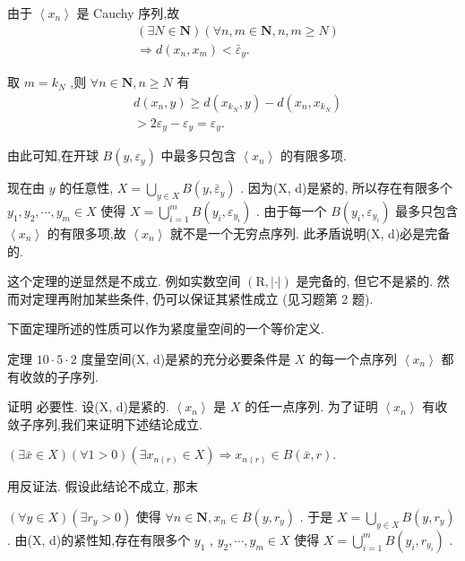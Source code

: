 由于 $\left\langle  {x}_{n}\right\rangle$ 是 Cauchy 序列,故
\begin{align*}
	&\left( {\exists N \in  \mathbf{N}}\right) \left( {\forall n,m \in  \mathbf{N},n,m \geq  N}\right)\\
	&\Rightarrow  d\left( {{x}_{n},{x}_{m}}\right)  < {\bar{\varepsilon }}_{y}.
\end{align*}

取 $m = {k}_{N}$ ,则 $\forall n \in  \mathbf{N},n \geq  N$ 有
\begin{align*}
	&d\left( {{x}_{n},y}\right)  \geq  d\left( {{x}_{{k}_{N}},y}\right)  - d\left( {{x}_{n},{x}_{{k}_{N}}}\right)\\
	&> 2{\varepsilon }_{y} - {\varepsilon }_{y} = {\varepsilon }_{y}.
\end{align*}

由此可知,在开球 $B\left( {y,{\varepsilon }_{y}}\right)$ 中最多只包含 $\left\langle  {x}_{n}\right\rangle$ 的有限多项.

现在由 $y$ 的任意性, $X = \mathop{\bigcup }\limits_{{y \in  X}}B\left( {y,{\bar{\varepsilon }}_{y}}\right)$ . 因为(X, d)是紧的, 所以存在有限多个 ${y}_{1},{y}_{2},\cdots ,{y}_{m} \in  X$ 使得 $X = \mathop{\bigcup }\limits_{{i = 1}}^{m}B\left( {{y}_{i},{\varepsilon }_{{y}_{i}}}\right)$ . 由于每一个 $B\left( {{y}_{i},{\varepsilon }_{{y}_{i}}}\right)$ 最多只包含 $\left\langle  {x}_{n}\right\rangle$ 的有限多项,故 $\left\langle  {x}_{n}\right\rangle$ 就不是一个无穷点序列. 此矛盾说明(X, d)必是完备的.

这个定理的逆显然是不成立. 例如实数空间 $\left( {\mathrm{R},\left| \cdot \right| }\right)$ 是完备的, 但它不是紧的. 然而对定理再附加某些条件, 仍可以保证其紧性成立 (见习题第 2 题).

下面定理所述的性质可以作为紧度量空间的一个等价定义.

定理 ${10} \cdot  5 \cdot  2$ 度量空间(X, d)是紧的充分必要条件是 $X$ 的每一个点序列 $\left\langle  {x}_{n}\right\rangle$ 都有收敛的子序列.

证明 必要性. 设(X, d)是紧的. $\left\langle  {x}_{n}\right\rangle$ 是 $X$ 的任一点序列. 为了证明 $\left\langle  {x}_{n}\right\rangle$ 有收敛子序列,我们来证明下述结论成立.

$\left( {\exists \bar{x} \in  X}\right) \left( {\forall 1 > 0}\right) \left( {\exists {x}_{n\left( r\right) } \in  X}\right)  \Rightarrow  {x}_{n\left( r\right) } \in  B\left( {\bar{x},r}\right) .$

用反证法. 假设此结论不成立, 那末

$\left( {\forall y \in  X}\right) \left( {\exists {r}_{y} > 0}\right)$ 使得 $\forall n \in  \mathbf{N},{x}_{n} \in  B\left( {y,{r}_{y}}\right)$ . 于是 $X = \mathop{\bigcup }\limits_{{y \in  X}}B\left( {y,{r}_{y}}\right)$ . 由(X, d)的紧性知,存在有限多个 ${y}_{1}$ , ${y}_{2},\cdots ,{y}_{m} \in  X$ 使得 $X = \mathop{\bigcup }\limits_{{i = 1}}^{m}B\left( {{y}_{i},{r}_{{y}_{i}}}\right)$ .

